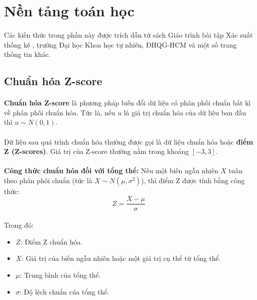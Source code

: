 \newpage
\section{Nền tảng toán học}

\paragraph{}{Các kiến thức trong phần này được trích dẫn từ sách Giáo trình bài tập Xác suất thống kê \cite{xstk}, trường Đại học Khoa học tự nhiên, ĐHQG-HCM và một số trang thông tin khác.}

\subsection{Chuẩn hóa Z-score}
\label{label:standart scaler}

\paragraph{}{\textbf{Chuẩn hóa Z-score} là phương pháp biến đổi dữ liệu có phân phối chuẩn bất kì về phân phối chuẩn hóa.} Tức là, nếu \(u\) là giá trị chuẩn hóa của dữ liệu ban đầu thì \textbf{\(u \sim N(0,1)\)}.

\paragraph{}{Dữ liệu sau quá trình chuẩn hóa thường được gọi là dữ liệu chuẩn hóa hoặc \textbf{điểm Z (Z-scores)}. Giá trị của Z-score thường nằm trong khoảng \([-3, 3]\).}

\paragraph{}{\textbf{Công thức chuẩn hóa đối với tổng thể:} Nếu một biến ngẫu nhiên $X$ tuân theo phân phối chuẩn (tức là $X \sim N(\mu, \sigma^2)$), thì điểm Z được tính bằng công thức:}
\[
Z = \frac{X - \mu}{\sigma}
\]
\paragraph{}{Trong đó:}
\begin{itemize}
    \item $Z$: Điểm Z chuẩn hóa.
    \item $X$: Giá trị của biến ngẫu nhiên hoặc một giá trị cụ thể từ tổng thể.
    \item $\mu$: Trung bình của tổng thể.
    \item $\sigma$: Độ lệch chuẩn của tổng thể.
\end{itemize}

